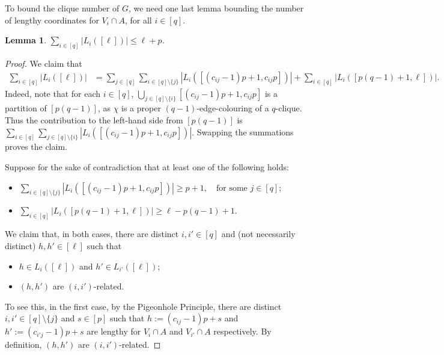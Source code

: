 \documentclass[10pt,a4paper]{article}
\newtheorem{lemma}[theorem]{Lemma}
\newtheorem{observation}[theorem]{Observation}
\theoremstyle{definition}
\begin{document}

To bound the clique number of $G$, we need one last lemma bounding the number of lengthy coordinates for $V_i\cap A$, for all $i\in[q]$.


\begin{lemma}\label{lem-allgoodcoord}
	$\sum_{i \in [q]}|L_i([\ell])| \leq \ell+p$.
\end{lemma}

\begin{proof}
	We claim that
	\begin{align*}
	\sum_{i \in [q]}|L_i([\ell])| &= \sum_{j \in [q]}\sum_{i \in [q]\setminus\{ j\}}|L_i([(c_{ij}-1)p+1,c_{ij}p])|+ \sum_{i \in [q]}|L_i([p(q-1)+1,\ell])|.
	\end{align*}
	Indeed, note that for each $i\in[q]$, $\bigcup_{j\in [q]\setminus\{i\}}[(c_{ij}-1)p+1,c_{ij}p]$ is a partition of $[p(q-1)]$, as $\chi$ is a proper $(q-1)$-edge-colouring of a $q$-clique. Thus the contribution to the left-hand side from $[p(q-1)]$ is $\sum_{i \in [q]}\sum_{j \in [q]\setminus\{ i\}}|L_i([(c_{ij}-1)p+1,c_{ij}p])|$. Swapping the summations proves the claim.
	
	Suppose for the sake of contradiction that at least one of the following holds:
	\begin{itemize}
		\item $\sum_{i \in [q]\setminus\{j\}}|L_i([(c_{ij}-1)p+1,c_{ij}p])| \geq p+1,\quad\text{for some } j \in [q]$;
		\item $\sum_{i \in [q]}|L_i([p(q-1)+1,\ell])| \geq \ell-p(q-1)+1$.
	\end{itemize}
	We claim that, in both cases, there are distinct $i,i' \in [q]$ and (not necessarily distinct) $h,h'\in[\ell]$ such that
	\begin{itemize}
		\item[(i)] $h\in L_i([\ell])$ and $h' \in L_{i'}([\ell])$;
		\item[(ii)] $(h,h')$ are $(i,i')$-related.
	\end{itemize}
	
	To see this, in the first case, by the Pigeonhole Principle, there are distinct $i,i' \in [q]\setminus\lbrace j\rbrace$ and $s \in [p]$ such that $h:=(c_{ij}-1)p+s$ and $h':=(c_{i'j}-1)p+s$ are lengthy for $V_i \cap A$ and $V_{i'} \cap A$ respectively. By definition, $(h,h')$ are $(i,i')$-related.
	

\end{proof}
\end{document}
